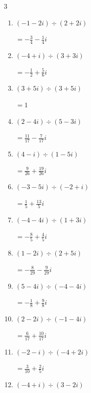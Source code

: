 \begin{multicols}{3}
\begin{enumerate}
        $\displaystyle =-\frac{17}{26}-\frac{19}{26}i$

  \item $\displaystyle (-1-2i)\div(2+2i)$

        $\displaystyle =-\frac{3}{4}-\frac{1}{4}i$

  \item $\displaystyle (-4+i)\div(3+3i)$

        $\displaystyle =-\frac{1}{2}+\frac{5}{6}i$

  \item $\displaystyle (3+5i)\div(3+5i)$

        $\displaystyle =1$

  \item $\displaystyle (2-4i)\div(5-3i)$

        $\displaystyle =\frac{11}{17}-\frac{7}{17}i$

\columnbreak %

  \item $\displaystyle (4-i)\div(1-5i)$

        $\displaystyle =\frac{9}{26}+\frac{19}{26}i$

  \item $\displaystyle (-3-5i)\div(-2+i)$

        $\displaystyle =\frac{1}{5}+\frac{13}{5}i$

  \item $\displaystyle (-4-4i)\div(1+3i)$

        $\displaystyle =-\frac{8}{5}+\frac{4}{5}i$

  \item $\displaystyle (1-2i)\div(2+5i)$

        $\displaystyle =-\frac{8}{29}-\frac{9}{29}i$

  \item $\displaystyle (5-4i)\div(-4-4i)$

        $\displaystyle =-\frac{1}{8}+\frac{9}{8}i$

  \item $\displaystyle (2-2i)\div(-1-4i)$

        $\displaystyle =\frac{6}{17}+\frac{10}{17}i$

  \item $\displaystyle (-2-i)\div(-4+2i)$

        $\displaystyle =\frac{3}{10}+\frac{2}{5}i$

  \item $\displaystyle (-4+i)\div(3-2i)$


\end{enumerate}
\end{multicols}
